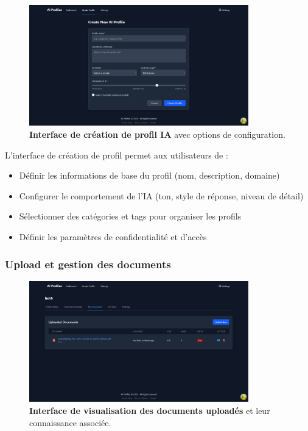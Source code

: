 \begin{figure}[H]
  \centering
  \includegraphics[width=0.85\textwidth,keepaspectratio]{pfe-pics/ai-profile-creation/creating_and_ai_prifile.png}
  \caption{\textbf{Interface de création de profil IA} avec options de configuration.}
  \label{fig:profile_creation}
\end{figure}

L'interface de création de profil permet aux utilisateurs de :

\begin{itemize}
  \item Définir les informations de base du profil (nom, description, domaine)
  \item Configurer le comportement de l'IA (ton, style de réponse, niveau de détail)
  \item Sélectionner des catégories et tags pour organiser les profils
  \item Définir les paramètres de confidentialité et d'accès
\end{itemize}

\subsubsection{Upload et gestion des documents}

\begin{figure}[H]
  \centering
  \includegraphics[width=0.85\textwidth,keepaspectratio]{pfe-pics/ai-profile-creation/see_upladed_documents_knoladge.png}
  \caption{\textbf{Interface de visualisation des documents uploadés} et leur connaissance associée.}
  \label{fig:document_knowledge}
\end{figure}

